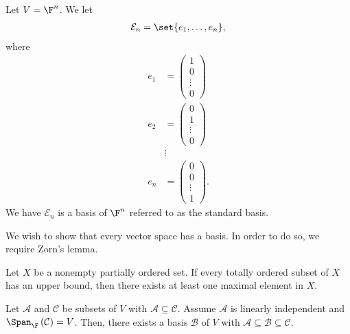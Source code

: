 \documentclass[10pt]{mypackage}
\begin{document}
\begin{example}
Let $V = \F^n$. We let
\begin{align*}
  \mathcal{E}_n = \set{e_1,\dots,e_n},
\end{align*}
where
\begin{align*}
  e_1 &= \begin{pmatrix}1\\0\\\vdots\\0\end{pmatrix}\\
  e_2 &= \begin{pmatrix}0\\1\\\vdots\\0\end{pmatrix}\\
      &\vdots\\
  e_n &= \begin{pmatrix}0\\0\\\vdots\\1\end{pmatrix}.
\end{align*}
We have $\mathcal{E}_n$ is a basis of $\F^n$ referred to as the standard basis.
\end{example}
We wish to show that every vector space has a basis. In order to do so, we require Zorn's lemma.
\begin{theorem}
  Let $X$ be a nonempty partially ordered set. If every totally ordered subset of $X$ has an upper bound, then there exists at least one maximal element in $X$.
\end{theorem}
\begin{theorem}
  Let $\mathcal{A}$ and $\mathcal{C}$ be subsets of $V$ with $\mathcal{A}\subseteq \mathcal{C}$. Assume $\mathcal{A}$ is linearly independent and $\Span_{\F}\left(\mathcal{C}\right) = V$. Then, there exists a basis $\mathcal{B}$ of $V$ with $\mathcal{A}\subseteq \mathcal{B}\subseteq \mathcal{C}$.
\end{theorem}
\end{document}
